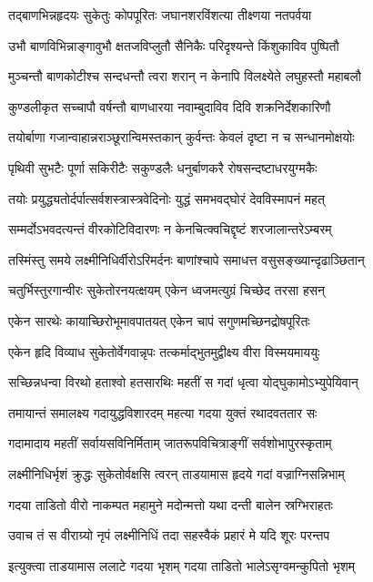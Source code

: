 \twolineshloka
{तद्बाणभिन्नहृदयः सुकेतुः कोपपूरितः}
{जघानशरविंशत्या तीक्ष्णया नतपर्वया}%

\twolineshloka
{उभौ बाणविभिन्नाङ्गावुभौ क्षतजविप्लुतौ}
{सैनिकैः परिदृश्यन्ते किंशुकाविव पुष्पितौ}%

\twolineshloka
{मुञ्चन्तौ बाणकोटीश्च सन्दधन्तौ त्वरा शरान्}
{न केनापि विलक्ष्येते लघुहस्तौ महाबलौ}%

\twolineshloka
{कुण्डलीकृत सच्चापौ वर्षन्तौ बाणधारया}
{नवाम्बुदाविव दिवि शक्रनिर्देशकारिणौ}%

\twolineshloka
{तयोर्बाणा गजान्वाहान्नराञ्छूरान्विमस्तकान्}
{कुर्वन्तः केवलं दृष्टा न च सन्धानमोक्षयोः}%

\twolineshloka
{पृथिवी सुभटैः पूर्णा सकिरीटैः सकुण्डलैः}
{धनुर्बाणकरै रोषसन्दष्टाधरयुग्मकैः}%

\twolineshloka
{तयोः प्रयुद्ध्यतोर्दर्पात्सर्वशस्त्रास्त्रवेदिनोः}
{युद्धं समभवद्घोरं देवविस्मापनं महत्}%

\twolineshloka
{सम्मर्दोऽभवदत्यन्तं वीरकोटिविदारणः}
{न केनचित्क्वचिद्दृष्टं शरजालान्तरेऽम्बरम्}%

\twolineshloka
{तस्मिंस्तु समये लक्ष्मीनिधिर्वीरोऽरिमर्दनः}
{बाणांश्चापे समाधत्त वसुसङ्ख्यान्दृढाञ्छितान्}%

\twolineshloka
{चतुर्भिस्तुरगान्वीरः सुकेतोरनयत्क्षयम्}
{एकेन ध्वजमत्युग्रं चिच्छेद तरसा हसन्}%

\twolineshloka
{एकेन सारथेः कायाच्छिरोभूमावपातयत्}
{एकेन चापं सगुणमच्छिनद्रोषपूरितः}%

\twolineshloka
{एकेन हृदि विव्याध सुकेतोर्वेगवान्नृपः}
{तत्कर्माद्भुतमुद्वीक्ष्य वीरा विस्मयमाययुः}%

\twolineshloka
{सच्छिन्नधन्वा विरथो हताश्वो हतसारथिः}
{महतीं स गदां धृत्वा योद्घुकामोऽभ्युपेयिवान्}%

\twolineshloka
{तमायान्तं समालक्ष्य गदायुद्धविशारदम्}
{महत्या गदया युक्तं रथादवततार सः}%

\twolineshloka
{गदामादाय महतीं सर्वायसविनिर्मिताम्}
{जातरूपविचित्राङ्गीं सर्वशोभापुरस्कृताम्}%

\twolineshloka
{लक्ष्मीनिधिर्भृशं क्रुद्धः सुकेतोर्वक्षसि त्वरन्}
{ताडयामास हृदये गदां वज्राग्निसन्निभाम्}%

\twolineshloka
{गदया ताडितो वीरो नाकम्पत महामुने}
{मदोन्मत्तो यथा दन्ती बालेन स्रग्भिराहतः}%

\twolineshloka
{उवाच तं स वीराग्र्यो नृपं लक्ष्मीनिधिं तदा}
{सहस्वैकं प्रहारं मे यदि शूरः परन्तप}%

\twolineshloka
{इत्युक्त्वा ताडयामास ललाटे गदया भृशम्}
{गदया ताडितो भालेऽसृग्वमन्कुपितो भृशम्}%

